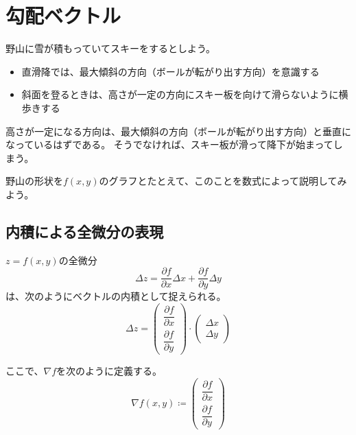 \documentclass[../../../topic_calculus]{subfiles}
\begin{document}
\sectionline
\section{勾配ベクトル}

野山に雪が積もっていてスキーをするとしよう。

\begin{itemize}
  \item 直滑降では、最大傾斜の方向（ボールが転がり出す方向）を意識する
  \item 斜面を登るときは、高さが一定の方向にスキー板を向けて滑らないように横歩きする
\end{itemize}

高さが一定になる方向は、最大傾斜の方向（ボールが転がり出す方向）と垂直になっているはずである。
そうでなければ、スキー板が滑って降下が始まってしまう。

\br

野山の形状を$f(x,y)$のグラフとたとえて、このことを数式によって説明してみよう。

\subsection{内積による全微分の表現}

$z=f(x,y)$の全微分
\begin{equation*}
  \Delta z = \frac{\partial f}{\partial x}\Delta x + \frac{\partial f}{\partial y}\Delta y
\end{equation*}
は、次のようにベクトルの内積として捉えられる。
\begin{equation*}
  \Delta z = \begin{pmatrix} \dfrac{\partial f}{\partial x} \\ \dfrac{\partial f}{\partial y} \end{pmatrix} \cdot \begin{pmatrix} \Delta x \\ \Delta y \end{pmatrix}
\end{equation*}

ここで、$\nabla f$を次のように定義する。
\begin{equation*}
  \nabla f(x,y) \coloneqq \begin{pmatrix} \dfrac{\partial f}{\partial x} \\ \dfrac{\partial f}{\partial y} \end{pmatrix}
\end{equation*}
\end{document}
